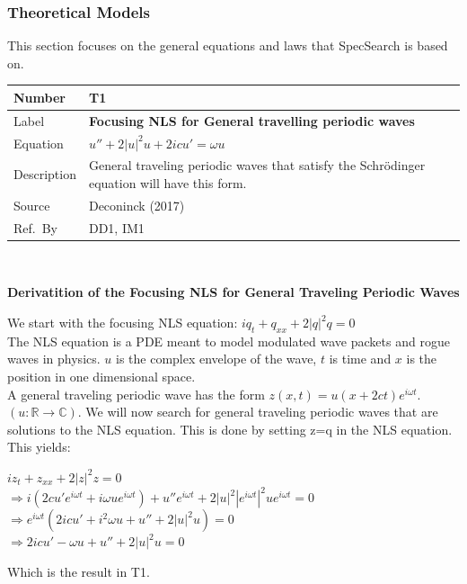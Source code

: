 \documentclass[12pt]{article}
\newcommand{\colAwidth}{0.13\textwidth}
\newcommand{\colBwidth}{0.82\textwidth}
\begin{document}
\subsubsection{Theoretical Models}\label{sec_theoretical}

This section focuses on the general equations and laws that SpecSearch is based
on. 
~\newline

\noindent
\begin{minipage}{\textwidth}
	\renewcommand*{\arraystretch}{1.5}
	\begin{tabular}{| p{\colAwidth} | p{\colBwidth}|}
		\hline
		\rowcolor[gray]{0.9}
		Number& T1\\
		\hline
		Label&\bf Focusing NLS for General travelling periodic waves\\
		\hline
		Equation&  $ u'' + 2|u|^{2}u+2icu'=\omega u$\\
		\hline
		Description & 
		General traveling periodic waves that satisfy the Schr\"{o}dinger 
		equation 
		will have this form. \\
		\hline
		Source &
		Deconinck (2017)\\
		\hline
		Ref.\ By & DD1, IM1\\
		\hline
	\end{tabular}
\end{minipage}\\ 

\begin{center}
\newpage
\begin{flushleft}
	\textbf{Derivatition of the Focusing NLS for 
		General Traveling Periodic 
		Waves}
\end{flushleft} 

\end{center} 

We start with the focusing NLS equation: $iq_{t} + q_{xx} + 
2|q|^{2}q=0$ \\ 

The NLS equation is a PDE meant to model modulated wave packets and rogue waves 
in physics. $u$ is the complex envelope of the wave, $t$ is time and $x$ is the 
position in one dimensional space. \\ 

A general traveling periodic wave has the form $z(x,t)=u(x+2ct)e^{i \omega 
t}$.$(u: \mathbb{R} \rightarrow \mathbb{C})$. 
We will now search for general traveling periodic waves that are solutions to 
the NLS equation. This is done by setting z=q in the NLS equation. This 
yields: \\ 
\begin{center}
$ iz_{t} + z_{xx} + 2|z|^{2}z = 0$ \\ 
$ \Rightarrow i(2cu'e^{i \omega t} + i \omega ue^{i \omega t}) + u''e^{i \omega 
t} + 2|u|^{2}|e^{i \omega t}|^{2} u e^{i \omega t} = 0 $ \\
 $\Rightarrow e^{i \omega t} (2icu' + i^{2} \omega u + u'' + 2|u|^{2}u) = 0 $ 
 \\ 
$ \Rightarrow 2icu' - \omega u + u'' + 2|u|^{2}u =0$ \\ 
\end{center}
Which is the result in T1.
\end{document}
